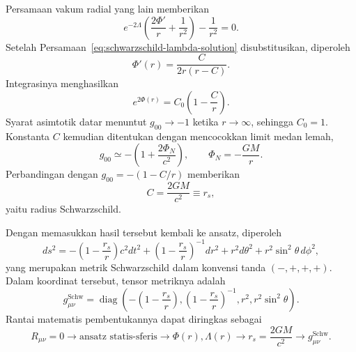Persamaan vakum radial yang lain memberikan
\begin{equation}
    e^{-2\Lambda}
    \left(
        \frac{2\Phi'}{r}+\frac{1}{r^2}
    \right)
    -\frac{1}{r^2}=0.
    \label{eq:schwarzschild-phi-ode}
\end{equation}
Setelah Persamaan~\eqref{eq:schwarzschild-lambda-solution} disubstitusikan,
diperoleh
\begin{equation}
    \Phi'(r)
    =\frac{C}{2r(r-C)}.
\end{equation}
Integrasinya menghasilkan
\begin{equation}
    e^{2\Phi(r)}
    =C_0\left(1-\frac{C}{r}\right).
    \label{eq:schwarzschild-phi-solution}
\end{equation}
Syarat asimtotik datar menuntut $g_{00}\rightarrow-1$ ketika
$r\rightarrow\infty$, sehingga $C_0=1$. Konstanta $C$ kemudian ditentukan
dengan mencocokkan limit medan lemah,
\begin{equation}
    g_{00}
    \simeq
    -\left(1+\frac{2\Phi_N}{c^2}\right),
    \qquad
    \Phi_N=-\frac{GM}{r}.
\end{equation}
Perbandingan dengan
$g_{00}=-(1-C/r)$ memberikan
\begin{equation}
    C=\frac{2GM}{c^2}
    \equiv r_s,
    \label{eq:schwarzschild-radius}
\end{equation}
yaitu radius Schwarzschild.

Dengan memasukkan hasil tersebut kembali ke ansatz, diperoleh
\begin{equation}
    ds^2
    =-\left(1-\frac{r_s}{r}\right)c^2dt^2
    +\left(1-\frac{r_s}{r}\right)^{-1}dr^2
    +r^2d\theta^2
    +r^2\sin^2\!\theta\,d\phi^2,
    \label{eq:schwarzschild}
\end{equation}
yang merupakan metrik Schwarzschild dalam konvensi tanda $(-,+,+,+)$.
Dalam koordinat tersebut, tensor metriknya adalah
\begin{equation}
    g_{\mu\nu}^{\mathrm{Schw}}
    =\operatorname{diag}\!\left(
        -\left(1-\frac{r_s}{r}\right),
        \left(1-\frac{r_s}{r}\right)^{-1},
        r^2,
        r^2\sin^2\!\theta
    \right).
    \label{eq:schwarzschild-matrix}
\end{equation}
Rantai matematis pembentukannya dapat diringkas sebagai
\begin{equation}
    R_{\mu\nu}=0
    \longrightarrow
    \text{ansatz statis-sferis}
    \longrightarrow
    \Phi(r),\Lambda(r)
    \longrightarrow
    r_s=\frac{2GM}{c^2}
    \longrightarrow
    g_{\mu\nu}^{\mathrm{Schw}}.
    \label{eq:schwarzschild-chain}
\end{equation}

